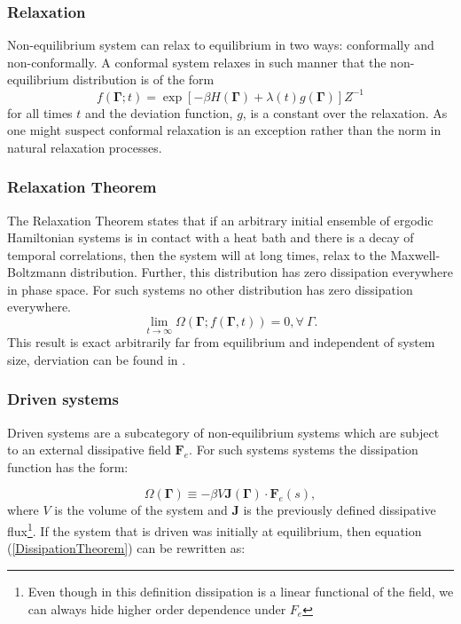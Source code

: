 \documentclass[a4paper,12pt]{article}
\begin{document}
\subsubsection{Relaxation}

Non-equilibrium system can relax to equilibrium in two ways: conformally and non-conformally.
A conformal system relaxes in such manner that the non-equilibrium distribution is of the form
\begin{equation}
  f(\bm{\Gamma};t)=\exp[-\beta H(\bm{\Gamma})+\lambda(t) g(\bm{\Gamma})] Z^{-1}
\end{equation}
for all times $t$ and the deviation function, $g$, is a constant over the relaxation.
As one might suspect conformal relaxation is an exception rather than the norm in natural relaxation processes.

\subsubsection{Relaxation Theorem}
The Relaxation Theorem states that if an arbitrary initial ensemble of ergodic Hamiltonian systems is in contact with a heat bath and there is a decay of temporal correlations, then the system will at long times, relax to the Maxwell-Boltzmann distribution. Further, this distribution has zero dissipation everywhere in phase space. For such systems no other distribution has zero dissipation everywhere.
\begin{displaymath}
  \lim_{t\to \infty } \Omega (\bm{\Gamma} ;f(\bm{\Gamma} ,t))=0, \forall\ \Gamma.
\end{displaymath}
This result is exact arbitrarily far from equilibrium and independent of system size, derviation can be found in \cite{Evans:2241458}.
\subsubsection{Driven systems}

Driven systems are a subcategory of non-equilibrium systems which are subject to an external dissipative field $\bm{F}_e$.
For such systems systems the dissipation function has the form:

\begin{equation}
\label{primaryDissipationFunction}
  \Omega(\bm{\Gamma})\equiv - \beta V \bm{J}(\bm{\Gamma})\cdot \bm{F}_e(s),
\end{equation}
where $V$ is the volume of the system and $\bm{J}$ is the previously defined dissipative flux\footnote{Even though in this definition dissipation is a linear functional of the field, we can always hide higher order dependence under $F_e$}.
If the system that is driven was initially at equilibrium, then equation (\ref{DissipationTheorem}) can be rewritten as:
\end{document}
